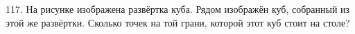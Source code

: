 117. На рисунке изображена развёртка куба. Рядом изображён куб, собранный из этой же развёртки. Сколько точек на той грани, которой этот куб стоит на столе?
\begin{center}
\begin{figure}[ht!]
\end{figure}
\end{center}
